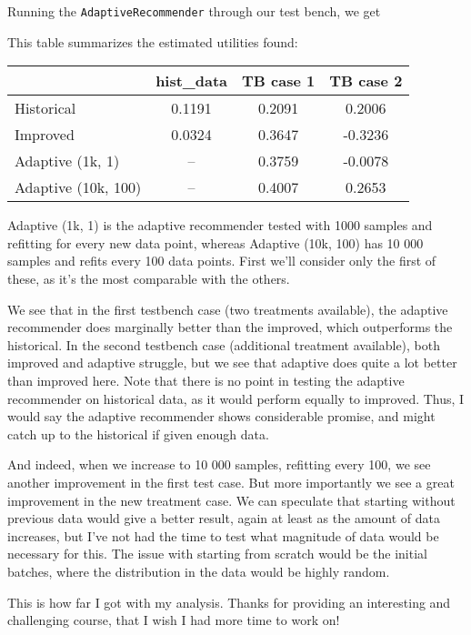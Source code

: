 \documentclass[a4paper]{article}
\begin{document}
Running the \texttt{AdaptiveRecommender} through our test bench, we get



This table summarizes the estimated utilities found:
\begin{table}[!htbp]
\begin{tabular}{|l|c|c|c|}
\hline
           & hist\_data & TB case 1 & TB case 2 \\ \hline
Historical & 0.1191     & 0.2091    & 0.2006    \\ \hline
Improved   & 0.0324     & 0.3647    & -0.3236   \\ \hline
Adaptive (1k, 1)  & --         & 0.3759    & -0.0078    \\ \hline
Adaptive (10k, 100)  & --         & 0.4007    & 0.2653    \\ \hline
\end{tabular}
\end{table}

Adaptive (1k, 1) is the adaptive recommender tested with 1000 samples and refitting for every
new data point, whereas Adaptive (10k, 100) has 10 000 samples and refits every 100 data points.
First we'll consider only the first of these, as it's the most comparable with the others.

We see that in the first testbench case (two treatments available), the adaptive recommender does
marginally better than the improved, which outperforms the historical. In the second testbench case
(additional treatment available), both improved and adaptive struggle, but we see that adaptive does
quite a lot better than improved here. Note that there is no point in testing the adaptive recommender
on historical data, as it would perform equally to improved. Thus, I would say the adaptive recommender
shows considerable promise, and might catch up to the historical if given enough data.

And indeed, when we increase to 10 000 samples, refitting every 100, we see another improvement in
the first test case. But more importantly we see a great improvement in the new treatment case. We
can speculate that starting without previous data would give a better result, again at least as
the amount of data increases, but I've not had the time to test what magnitude of data would be
necessary for this. The issue with starting from scratch would be the initial batches, where the
distribution in the data would be highly random.

This is how far I got with my analysis. Thanks for providing an interesting and challenging course, that
I wish I had more time to work on!
\end{document}
